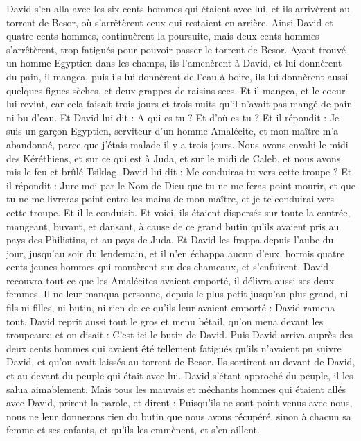 \begin{multicols}{2}
David s’en alla avec les six cents hommes qui étaient avec lui, et ils arrivèrent au torrent de Besor, où s’arrêtèrent ceux qui restaient en arrière.
Ainsi David et quatre cents hommes, continuèrent la poursuite, mais deux cents hommes s’arrêtèrent, trop fatigués pour pouvoir passer le torrent de Besor.
Ayant trouvé un homme Egyptien dans les champs, ils l’amenèrent à David, et lui donnèrent du pain, il mangea, puis ils lui donnèrent de l’eau à boire,
ils lui donnèrent aussi quelques figues sèches, et deux grappes de raisins secs. Et il mangea, et le coeur lui revint, car cela faisait trois jours et trois nuits qu’il n’avait pas mangé de pain ni bu d’eau.
Et David lui dit : A qui es-tu ? Et d’où es-tu ? Et il répondit : Je suis un garçon Egyptien, serviteur d’un homme Amalécite, et mon maître m’a abandonné, parce que j’étais malade il y a trois jours.
Nous avons envahi le midi des Kéréthiens, et sur ce qui est à Juda, et sur le midi de Caleb, et nous avons mis le feu et brûlé Tsiklag.
David lui dit : Me conduiras-tu vers cette troupe ? Et il répondit : Jure-moi par le Nom de Dieu que tu ne me feras point mourir, et que tu ne me livreras point entre les mains de mon maître, et je te conduirai vers cette troupe.
Et il le conduisit. Et voici, ils étaient dispersés sur toute la contrée, mangeant, buvant, et dansant, à cause de ce grand butin qu’ils avaient pris au pays des Philistins, et au pays de Juda.
Et David les frappa depuis l’aube du jour, jusqu’au soir du lendemain, et il n’en échappa aucun d’eux, hormis quatre cents jeunes hommes qui montèrent sur des chameaux, et s’enfuirent.
David recouvra tout ce que les Amalécites avaient emporté, il délivra aussi ses deux femmes.
Il ne leur manqua personne, depuis le plus petit jusqu’au plus grand, ni fils ni filles, ni butin, ni rien de ce qu’ils leur avaient emporté : David ramena tout.
David reprit aussi tout le gros et menu bétail, qu’on mena devant les troupeaux; et on disait : C’est ici le butin de David.
Puis David arriva auprès des deux cents hommes qui avaient été tellement fatigués qu’ils n’avaient pu suivre David, et qu’on avait laissés au torrent de Besor. Ils sortirent au-devant de David, et au-devant du peuple qui était avec lui. David s’étant approché du peuple, il les salua aimablement.
Mais tous les mauvais et méchants hommes qui étaient allés avec David, prirent la parole, et dirent : Puisqu’ils ne sont point venus avec nous, nous ne leur donnerons rien du butin que nous avons récupéré, sinon à chacun sa femme et ses enfants, et qu’ils les emmènent, et s’en aillent.

\end{multicols}
